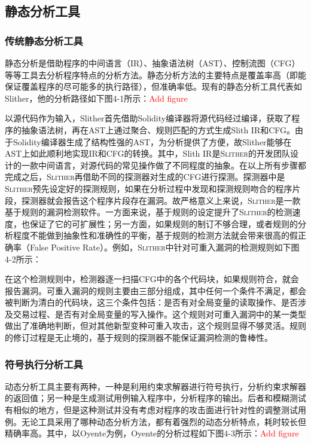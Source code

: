 \subsection{静态分析工具}

\subsubsection{传统静态分析工具}

静态分析是借助程序的中间语言（IR）、抽象语法树（AST）、控制流图（CFG）等等工具去分析程序特点的分析方法。静态分析方法的主要特点是覆盖率高（即能保证覆盖程序的尽可能多的执行路径），但准确率低。现有的静态分析工具代表如Slither，他的分析路径如下图4-1所示：\textcolor{red}{Add figure}

以源代码作为输入，Slither首先借助Solidity编译器将源代码经过编译，获取了程序的抽象语法树，再在AST上通过聚合、规则匹配的方式生成Slith IR和CFG。由于Solidity编译器生成了结构性强的AST，为分析提供了方便，故Slither能够在AST上如此顺利地实现IR和CFG的转换。其中，Slith IR是\textsc{Slither}的开发团队设计的一款中间语言，对源代码的常见操作做了不同程度的抽象。在以上所有步骤都完成之后，\textsc{Slither}再借助不同的探测器对生成的CFG进行探测。探测器中是\textsc{Slither}预先设定好的探测规则，如果在分析过程中发现和探测规则吻合的程序片段，探测器就会报告这个程序片段存在漏洞。故严格意义上来说，\textsc{Slither}是一款基于规则的漏洞检测软件。一方面来说，基于规则的设定提升了\textsc{Slither}的检测速度，也保证了它的可扩展性；另一方面，如果规则的制订不够合理，或者规则的分析程度不能做到抽象性和准确性的平衡，基于规则的检测方法就会带来很高的假正确率（False Positive Rate）。例如，\textsc{Slither}中针对可重入漏洞的检测规则如下图4-2所示：

在这个检测规则中，检测器逐一扫描CFG中的各个代码块，如果规则符合，就会报告漏洞。可重入漏洞的规则主要由三部分组成，其中任何一个条件不满足，都会被判断为清白的代码块，这三个条件包括：是否有对全局变量的读取操作、是否涉及交易过程、是否有对全局变量的写入操作。这个规则对可重入漏洞中的某一类型做出了准确地判断，但对其他新型变种可重入攻击，这个规则显得不够灵活。规则的修订过程是无止境的，基于规则的探测器不能保证漏洞检测的鲁棒性。


\subsubsection{符号执行分析工具}

动态分析工具主要有两种，一种是利用约束求解器进行符号执行，分析约束求解器的返回值；另一种是生成测试用例输入程序中，分析程序的输出。后者和模糊测试有相似的地方，但是这种测试并没有考虑对程序的攻击面进行针对性的调整测试用例。无论工具采用了哪种动态分析方法，都有着强烈的动态分析特点，耗时较长但精确率高。其中，以Oyente为例，Oyente的分析过程如下图4-3所示：\textcolor{red}{Add figure}

